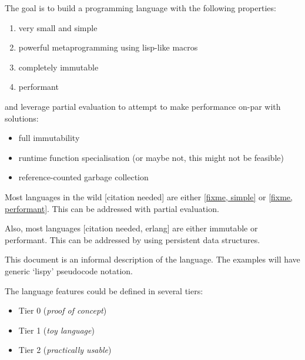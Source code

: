 \documentclass[main.tex]{subfiles}
\begin{document}
The goal is to build a programming language with the following properties:
\begin{enumerate}
    \item very small and simple
    \item powerful metaprogramming using lisp-like macros
    \item completely immutable
    \item performant
\end{enumerate}

 and
leverage partial evaluation to attempt to make performance on-par with
 solutions:
\begin{itemize}
    \item full immutability
    \item runtime function specialisation (or maybe not, this might not be feasible)
    \item reference-counted garbage collection
\end{itemize}

Most languages in the wild [citation needed] are either \ref{fixme, simple} or
\ref{fixme, performant}. This can be addressed with partial evaluation.

Also, most languages [citation needed, erlang] are either immutable or performant.
This can be addressed by using persistent data structures.




This document is an informal description of the language. The examples will
have generic `lispy' pseudocode notation.

The language features could be defined in several tiers:
\begin{itemize}
    \item Tier 0 (\emph{proof of concept})
    \item Tier 1 (\emph{toy language})
    \item Tier 2 (\emph{practically usable})
\end{itemize}
\end{document}
